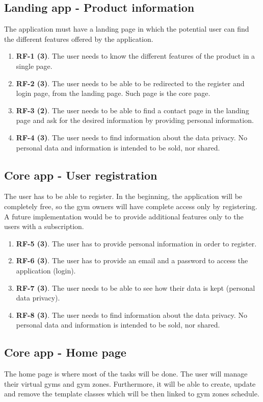 \documentclass[a4paper, 12pt, oneside]{book}
\begin{document}
\subsection{Landing app - Product information}
The application must have a landing page in which the potential user can find the different features offered by the application.
\begin{enumerate}[label = -]
	\item \textbf{RF-1 (3)}. The user needs to know the different features of the product in a single page.
	\item \textbf{RF-2 (3)}. The user needs to be able to be redirected to the register and login page, from the landing page. Such page is the core page.
	\item \textbf{RF-3 (2)}. The user needs to be able to find a contact page in the landing page and ask for the desired information by providing personal information.
	\item \textbf{RF-4 (3)}. The user needs to find information about the data privacy. No personal data and information is intended to be sold, nor shared.
\end{enumerate}
\subsection{Core app - User registration}
The user has to be able to register. In the beginning, the application will be completely free, so the gym owners will have complete access only by registering. A future implementation would be to provide additional features only to the users with a subscription.
\begin{enumerate}[label = -]
	\item \textbf{RF-5 (3)}. The user has to provide personal information in order to register.
	\item \textbf{RF-6 (3)}. The user has to provide an email and a password to access the application (login).
	\item \textbf{RF-7 (3)}. The user needs to be able to see how their data is kept (personal data privacy).
	\item \textbf{RF-8 (3)}. The user needs to find information about the data privacy. No personal data and information is intended to be sold, nor shared.
\end{enumerate}
\subsection{Core app - Home page}
The home page is where most of the tasks will be done. The user will manage their virtual gyms and gym zones. Furthermore, it will be able to create, update and remove the template classes which will be then linked to gym zones schedule.
\end{document}
